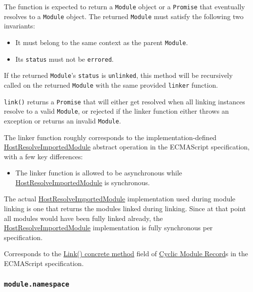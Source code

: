 The function is expected to return a \texttt{Module} object or a
\texttt{Promise} that eventually resolves to a \texttt{Module} object.
The returned \texttt{Module} must satisfy the following two invariants:

\begin{itemize}
\tightlist
\item
  It must belong to the same context as the parent \texttt{Module}.
\item
  Its \texttt{status} must not be
  \texttt{\textquotesingle{}errored\textquotesingle{}}.
\end{itemize}

If the returned \texttt{Module}'s \texttt{status} is
\texttt{\textquotesingle{}unlinked\textquotesingle{}}, this method will
be recursively called on the returned \texttt{Module} with the same
provided \texttt{linker} function.

\texttt{link()} returns a \texttt{Promise} that will either get resolved
when all linking instances resolve to a valid \texttt{Module}, or
rejected if the linker function either throws an exception or returns an
invalid \texttt{Module}.

The linker function roughly corresponds to the implementation-defined
\href{https://tc39.es/ecma262/\#sec-hostresolveimportedmodule}{HostResolveImportedModule}
abstract operation in the ECMAScript specification, with a few key
differences:

\begin{itemize}
\tightlist
\item
  The linker function is allowed to be asynchronous while
  \href{https://tc39.es/ecma262/\#sec-hostresolveimportedmodule}{HostResolveImportedModule}
  is synchronous.
\end{itemize}

The actual
\href{https://tc39.es/ecma262/\#sec-hostresolveimportedmodule}{HostResolveImportedModule}
implementation used during module linking is one that returns the
modules linked during linking. Since at that point all modules would
have been fully linked already, the
\href{https://tc39.es/ecma262/\#sec-hostresolveimportedmodule}{HostResolveImportedModule}
implementation is fully synchronous per specification.

Corresponds to the
\href{https://tc39.es/ecma262/\#sec-moduledeclarationlinking}{Link()
concrete method} field of
\href{https://tc39.es/ecma262/\#sec-cyclic-module-records}{Cyclic Module
Record}s in the ECMAScript specification.

\subsubsection{\texorpdfstring{\texttt{module.namespace}}{module.namespace}}\label{module.namespace}

